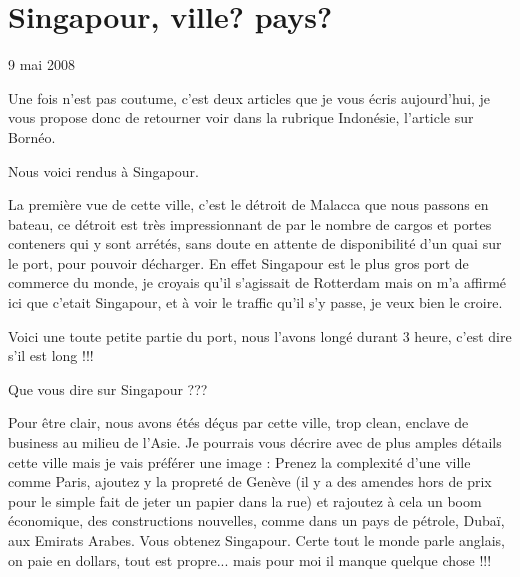 \section{Singapour, ville? pays?}

9 mai 2008

\begin{multicols}{2}

Une fois n'est pas coutume, c'est deux articles que je vous écris aujourd'hui, je vous propose donc de retourner voir dans la rubrique Indonésie, l'article sur Bornéo.

Nous voici rendus à Singapour.

La première vue de cette ville, c'est le détroit de Malacca que nous passons en bateau, ce détroit est très impressionnant de par le nombre de cargos et portes conteners qui y sont arrétés, sans doute en attente de disponibilité d'un quai sur le port, pour pouvoir décharger. En effet Singapour est le plus gros port de commerce du monde, je croyais qu'il s'agissait de Rotterdam mais on m'a affirmé ici que c'etait Singapour, et à voir le traffic qu'il s'y passe, je veux bien le croire.


Voici une toute petite partie du port, nous l'avons longé durant 3 heure, c'est dire s'il est long !!!


Que vous dire sur Singapour ???

Pour être clair, nous avons étés déçus par cette ville, trop clean, enclave de business au milieu de l'Asie. Je pourrais vous décrire avec de plus amples détails cette ville mais je vais préférer une image : Prenez la complexité d'une ville comme Paris, ajoutez y la propreté de Genève (il y a des amendes hors de prix pour le simple fait de jeter un papier dans la rue) et rajoutez à cela un boom économique, des constructions nouvelles, comme dans un pays de pétrole, Dubaï, aux Emirats Arabes. Vous obtenez Singapour. Certe tout le monde parle anglais, on paie en dollars, tout est propre... mais pour moi il manque quelque chose !!!


\end{multicols}
